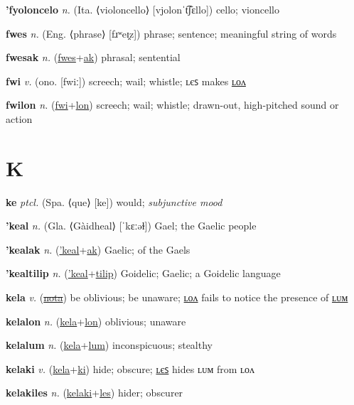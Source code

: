 \textbf{\hypertarget{'fyoloncelo}{'fyoloncelo}} \textit{n.} (Ita. ⟨violoncello⟩ [vjolonˈt͡ʃɛllo])
cello; vioncello

\textbf{\hypertarget{fwes}{fwes}} \textit{n.} (Eng. ⟨phrase⟩ [fɹʷeɪ̯z])
phrase; sentence; meaningful string of words

\textbf{\hypertarget{fwesak}{fwesak}} \textit{n.} (\hyperlink{fwes}{fwes}+\allowbreak \hyperlink{ak}{ak})
phrasal; sentential

\textbf{\hypertarget{fwi}{fwi}} \textit{v.} (ono. [fwiː])
screech; wail; whistle; ʟєꜱ makes \hyperlink{fwilon}{ʟᴏᴧ}

\textbf{\hypertarget{fwilon}{fwilon}} \textit{n.} (\hyperlink{fwi}{fwi}+\allowbreak \hyperlink{lon}{lon})
screech; wail; whistle; drawn-out, high-pitched sound or action

\section{K}

\textbf{\hypertarget{ke}{ke}} \textit{ptcl.} (Spa. ⟨que⟩ [ke])
would; \textit{subjunctive mood}

\textbf{\hypertarget{'keal}{'keal}} \textit{n.} (Gla. ⟨Gàidheal⟩ [ˈkɛːəɫ])
Gael; the Gaelic people

\textbf{\hypertarget{'kealak}{'kealak}} \textit{n.} (\hyperlink{'keal}{'keal}+\allowbreak \hyperlink{ak}{ak})
Gaelic; of the Gaels

\textbf{\hypertarget{'kealtilip}{'kealtilip}} \textit{n.} (\hyperlink{'keal}{'keal}+\allowbreak \hyperlink{tilip}{tilip})
Goidelic; Gaelic; a Goidelic language

\textbf{\hypertarget{kela}{kela}} \textit{v.} (\hyperlink{nota}{\sout{nota}})
be oblivious; be unaware; \hyperlink{kelalon}{ʟᴏᴧ} fails to notice the presence of \hyperlink{kelalum}{ʟᴜᴍ}

\textbf{\hypertarget{kelalon}{kelalon}} \textit{n.} (\hyperlink{kela}{kela}+\allowbreak \hyperlink{lon}{lon})
oblivious; unaware

\textbf{\hypertarget{kelalum}{kelalum}} \textit{n.} (\hyperlink{kela}{kela}+\allowbreak \hyperlink{lum}{lum})
inconspicuous; stealthy

\textbf{\hypertarget{kelaki}{kelaki}} \textit{v.} (\hyperlink{kela}{kela}+\allowbreak \hyperlink{ki}{ki})
hide; obscure; \hyperlink{kelakiles}{ʟєꜱ} hides ʟᴜᴍ from ʟᴏᴧ

\textbf{\hypertarget{kelakiles}{kelakiles}} \textit{n.} (\hyperlink{kelaki}{kelaki}+\allowbreak \hyperlink{les}{les})
hider; obscurer

